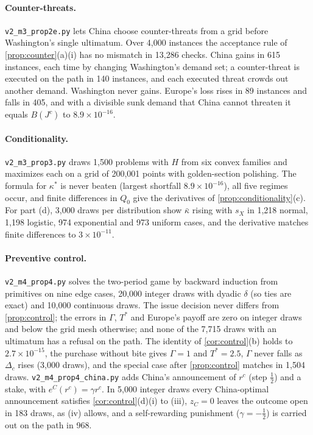 \paragraph{Counter-threats.} \texttt{v2\_m3\_prop2e.py} lets China choose counter-threats from a grid before Washington's single ultimatum. Over 4,000 instances the acceptance rule of \cref{prop:counter}(a)(i) has no mismatch in 13,286 checks. China gains in 615 instances, each time by changing Washington's demand set; a counter-threat is executed on the path in 140 instances, and each executed threat crowds out another demand. Washington never gains. Europe's loss rises in 89 instances and falls in 405, and with a divisible sunk demand that China cannot threaten it equals $B(J^c)$ to $8.9\times10^{-16}$.

\paragraph{Conditionality.} \texttt{v2\_m3\_prop3.py} draws 1,500 problems with $H$ from six convex families and maximizes each on a grid of 200,001 points with golden-section polishing. The formula for $\kappa^*$ is never beaten (largest shortfall $8.9\times10^{-16}$), all five regimes occur, and finite differences in $Q_0$ give the derivatives of \cref{prop:conditionality}(c). For part (d), 3,000 draws per distribution show $\bar\kappa$ rising with $s_X$ in 1,218 normal, 1,198 logistic, 974 exponential and 973 uniform cases, and the derivative matches finite differences to $3\times10^{-11}$.

\paragraph{Preventive control.} \texttt{v2\_m4\_prop4.py} solves the two-period game by backward induction from primitives on nine edge cases, 20,000 integer draws with dyadic $\delta$ (so ties are exact) and 10,000 continuous draws. The issue decision never differs from \cref{prop:control}; the errors in $\Gamma$, $T^*$ and Europe's payoff are zero on integer draws and below the grid mesh otherwise; and none of the 7,715 draws with an ultimatum has a refusal on the path. The identity of \cref{cor:control}(b) holds to $2.7\times10^{-15}$, the purchase without bite gives $\Gamma=1$ and $T^*=2.5$, $\Gamma$ never falls as $\Delta_c$ rises (3,000 draws), and the special case after \cref{prop:control} matches in 1,504 draws. \texttt{v2\_m4\_prop4\_china.py} adds China's announcement of $r^c$ (step $\tfrac12$) and a stake, with $e^C(r^c)=\gamma r^c$. In 5,000 integer draws every China-optimal announcement satisfies \cref{cor:control}(d)(i) to (iii), $z_C=0$ leaves the outcome open in 183 draws, as (iv) allows, and a self-rewarding punishment ($\gamma=-\tfrac12$) is carried out on the path in 968.


